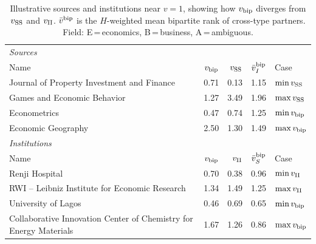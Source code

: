 \begin{table}[htbp]
\centering\small
\caption{Illustrative sources and institutions near $v=1$, showing how
$v_{\rm bip}$ diverges from $v_{\rm SS}$ and $v_{\rm II}$.
$\bar{v}^{\rm bip}$ is the $H$-weighted mean bipartite rank of cross-type
partners. Field: E\,=\,economics, B\,=\,business, A\,=\,ambiguous.}
\label{tab:unit_effects}
\begin{tabular}{lrrrl}
\toprule
\multicolumn{5}{l}{\textit{Sources}} \\[2pt]
Name & $v_{\rm bip}$ & $v_{\rm SS}$ & $\bar{v}_{I}^{\rm bip}$ & Case \\
\midrule
Journal of Property Investment and Finance & 0.71 & 0.13 & 1.15 & $\min v_{\rm SS}$ \\
Games and Economic Behavior & 1.27 & 3.49 & 1.96 & $\max v_{\rm SS}$ \\
Econometrics & 0.47 & 0.74 & 1.25 & $\min v_{\rm bip}$ \\
Economic Geography & 2.50 & 1.30 & 1.49 & $\max v_{\rm bip}$ \\
\midrule
\multicolumn{5}{l}{\textit{Institutions}} \\[2pt]
Name & $v_{\rm bip}$ & $v_{\rm II}$ & $\bar{v}_{S}^{\rm bip}$ & Case \\
\midrule
Renji Hospital & 0.70 & 0.38 & 0.96 & $\min v_{\rm II}$ \\
RWI – Leibniz Institute for Economic Research & 1.34 & 1.49 & 1.25 & $\max v_{\rm II}$ \\
University of Lagos & 0.46 & 0.69 & 0.65 & $\min v_{\rm bip}$ \\
Collaborative Innovation Center of Chemistry for Energy Materials & 1.67 & 1.26 & 0.86 & $\max v_{\rm bip}$ \\
\bottomrule
\end{tabular}
\end{table}
